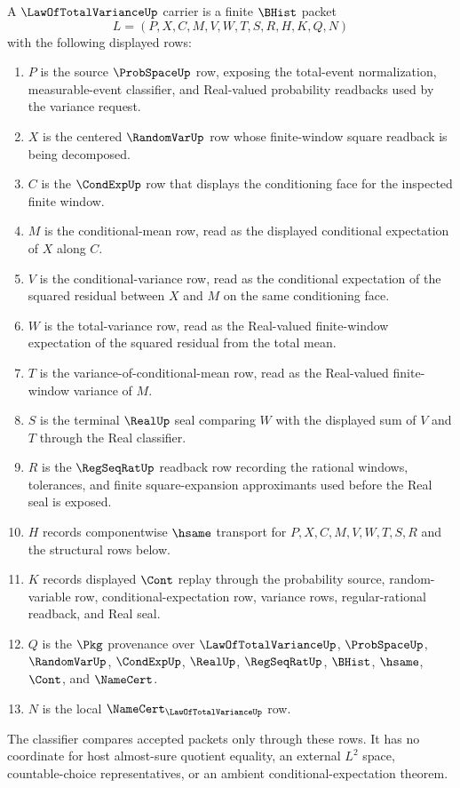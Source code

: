 \begin{definition}
\label{def:law-of-total-variance-carrier}
A $\LawOfTotalVarianceUp$ carrier is a finite $\BHist$ packet
$$
L=(P,X,C,M,V,W,T,S,R,H,K,Q,N)
$$
with the following displayed rows:
\begin{enumerate}
\item $P$ is the source $\ProbSpaceUp$ row, exposing the total-event normalization, measurable-event classifier, and Real-valued probability readbacks used by the variance request.
\item $X$ is the centered $\RandomVarUp$ row whose finite-window square readback is being decomposed.
\item $C$ is the $\CondExpUp$ row that displays the conditioning face for the inspected finite window.
\item $M$ is the conditional-mean row, read as the displayed conditional expectation of $X$ along $C$.
\item $V$ is the conditional-variance row, read as the conditional expectation of the squared residual between $X$ and $M$ on the same conditioning face.
\item $W$ is the total-variance row, read as the Real-valued finite-window expectation of the squared residual from the total mean.
\item $T$ is the variance-of-conditional-mean row, read as the Real-valued finite-window variance of $M$.
\item $S$ is the terminal $\RealUp$ seal comparing $W$ with the displayed sum of $V$ and $T$ through the Real classifier.
\item $R$ is the $\RegSeqRatUp$ readback row recording the rational windows, tolerances, and finite square-expansion approximants used before the Real seal is exposed.
\item $H$ records componentwise $\hsame$ transport for $P,X,C,M,V,W,T,S,R$ and the structural rows below.
\item $K$ records displayed $\Cont$ replay through the probability source, random-variable row, conditional-expectation row, variance rows, regular-rational readback, and Real seal.
\item $Q$ is the $\Pkg$ provenance over $\LawOfTotalVarianceUp$, $\ProbSpaceUp$, $\RandomVarUp$, $\CondExpUp$, $\RealUp$, $\RegSeqRatUp$, $\BHist$, $\hsame$, $\Cont$, and $\NameCert$.
\item $N$ is the local $\NameCert_{\LawOfTotalVarianceUp}$ row.
\end{enumerate}
The classifier compares accepted packets only through these rows. It has no coordinate for host almost-sure quotient equality, an external $L^2$ space, countable-choice representatives, or an ambient conditional-expectation theorem.
\end{definition}

